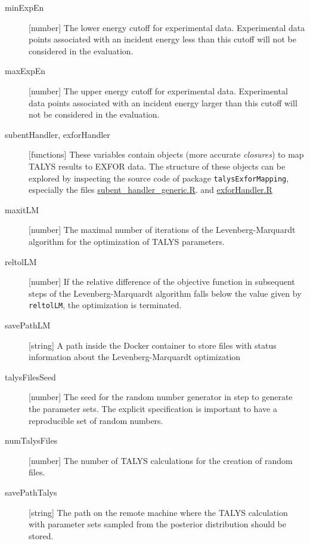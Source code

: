 \documentclass[12pt,a4paper]{scrartcl}
\begin{document}
\begin{description}
 \item[minExpEn]
 [number] The lower energy cutoff for experimental data.
 Experimental data points associated with an incident energy less than this cutoff will not be considered in the evaluation.
 
 \item[maxExpEn]
 [number] The upper energy cutoff for experimental data.
 Experimental data points associated with an incident energy larger than this cutoff will not be considered in the evaluation.
 
 \item[subentHandler, exforHandler]
 [functions] These variables contain objects (more accurate \textit{closures}) to map TALYS results to EXFOR data.
 The structure of these objects can be explored by inspecting the source code of package \verb#talysExforMapping#,
  especially the files \href{https://github.com/gschnabel/talysExforMapping/blob/master/R/subent_handler_generic.R}{subent\_handler\_generic.R}.
 and \href{https://github.com/gschnabel/talysExforMapping/blob/master/R/exfor_handler.R}{exforHandler.R}
  
 \item[maxitLM]
 [number] The maximal number of iterations of the Levenberg-Marquardt algorithm for the optimization of TALYS parameters.
 
 \item[reltolLM] 
 [number] If the relative difference of the objective function in subsequent steps of the Levenberg-Marquardt algorithm falls below the value given by \verb#reltolLM#, the optimization is terminated.
 
 \item[savePathLM]
 [string] A path inside the Docker container to store files with status information about the Levenberg-Marquardt optimization
 
 \item[talysFilesSeed]
 [number] The seed for the random number generator in step  to generate the parameter sets.
 The explicit specification is important to have a reproducible set of random numbers.
 
 \item[numTalysFiles]
 [number] The number of TALYS calculations for the creation of random files.
 
 \item[savePathTalys]
 [string] The path on the remote machine where the TALYS calculation with parameter sets sampled from the posterior distribution should be stored.
 
 \end{description} 
 
\end{document}
